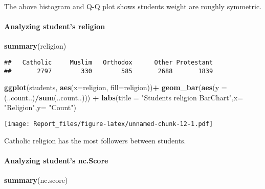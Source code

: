 \documentclass[
]{article}
\newenvironment{Shaded}{\begin{snugshade}}{\end{snugshade}}
\newcommand{\DataTypeTok}[1]{\textcolor[rgb]{0.13,0.29,0.53}{#1}}
\newcommand{\KeywordTok}[1]{\textcolor[rgb]{0.13,0.29,0.53}{\textbf{#1}}}
\newcommand{\NormalTok}[1]{#1}
\newcommand{\OperatorTok}[1]{\textcolor[rgb]{0.81,0.36,0.00}{\textbf{#1}}}
\newcommand{\StringTok}[1]{\textcolor[rgb]{0.31,0.60,0.02}{#1}}
\begin{document}
The above histogram and Q-Q plot shows students weight are roughly
symmetric.

\hypertarget{analyzing-students-religion}{%
\paragraph{Analyzing student's
religion}\label{analyzing-students-religion}}

\begin{Shaded}
\begin{Highlighting}[]
\KeywordTok{summary}\NormalTok{(religion)}
\end{Highlighting}
\end{Shaded}

\begin{verbatim}
##   Catholic     Muslim   Orthodox      Other Protestant 
##       2797        330        585       2688       1839
\end{verbatim}

\begin{Shaded}
\begin{Highlighting}[]
\KeywordTok{ggplot}\NormalTok{(students, }\KeywordTok{aes}\NormalTok{(}\DataTypeTok{x=}\NormalTok{religion, }\DataTypeTok{fill=}\NormalTok{religion))}\OperatorTok{+}
\StringTok{  }\KeywordTok{geom_bar}\NormalTok{(}\KeywordTok{aes}\NormalTok{(}\DataTypeTok{y =}\NormalTok{ (..count..)}\OperatorTok{/}\KeywordTok{sum}\NormalTok{(..count..))) }\OperatorTok{+}\StringTok{ }
\StringTok{  }\KeywordTok{labs}\NormalTok{(}\DataTypeTok{title =} \StringTok{"Students religion BarChart"}\NormalTok{,}\DataTypeTok{x=} \StringTok{"Religion"}\NormalTok{,}\DataTypeTok{y=} \StringTok{"Count"}\NormalTok{)}
\end{Highlighting}
\end{Shaded}

\texttt{[image: Report\_files/figure-latex/unnamed-chunk-12-1.pdf]}

Catholic religion has the most followers between students.

\hypertarget{analyzing-students-nc.score}{%
\paragraph{Analyzing student's
nc.Score}\label{analyzing-students-nc.score}}

\begin{Shaded}
\begin{Highlighting}[]
\KeywordTok{summary}\NormalTok{(nc.score)}
\end{Highlighting}
\end{Shaded}
\end{document}
